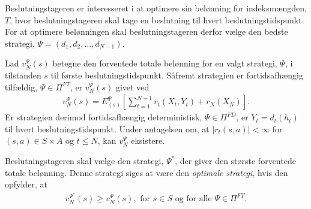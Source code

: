 
Beslutningstageren er interesseret i at optimere sin belønning for indeksmængden, $T$, hvor beslutningstageren skal tage en beslutning til hvert beslutningstidspunkt. For at optimere belønningen skal beslutningstageren derfor vælge den bedste strategi, $\Psi=(d_1, d_2,\dots, d_{N-1})$.

Lad $v_N^\Psi(s)$ betegne den forventede totale belønning for en valgt strategi, $\Psi$, i tilstanden $s$ til første beslutningstidspunkt. Såfremt strategien er fortidsafhængig tilfældig, $\Psi\in \Pi^{FT}$, er $v_N^\Psi(s)$ givet ved
\begin{align*}
    v_N^{\Psi}(s)=E_{(s)}^{\Psi}\left[\sum_{t=1}^{N-1}r_t(X_t, Y_t)+r_N(X_N)\right].
\end{align*}
Er strategien derimod fortidsafhængig deterministisk, $\Psi\in\Pi^{FD}$, er $Y_t = d_t(h_t)$ til hvert beslutningstidspunkt. Under antagelsen om, at $|r_t(s,a)| < \infty$ for $(s,a) \in S \times A$ og $t \leq N$, kan $v_N^\Psi$ eksistere. 




Beslutningstageren skal vælge den strategi, $\Psi^*$, der giver den største forventede totale belønning. Denne strategi siges at være den \textit{optimale strategi}, hvis den opfylder, at %
\begin{align*}
    v_N^{\Psi^*}(s)\geq v_N^{\Psi}(s), \text{ for } s\in S \text{ og for alle } \Psi\in \Pi^{FT}.
\end{align*}


